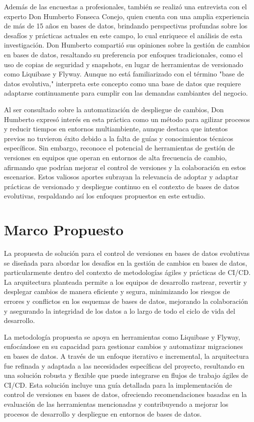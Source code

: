 \documentclass{IEEEtran}
\begin{document}
Además de las encuestas a profesionales, también se realizó una entrevista con el experto Don Humberto Fonseca Conejo, quien cuenta con una amplia experiencia de más de 15 años en bases de datos, brindando perspectivas profundas sobre los desafíos y prácticas actuales en este campo, lo cual enriquece el análisis de esta investigación. Don Humberto compartió sus opiniones sobre la gestión de cambios en bases de datos, resaltando su preferencia por enfoques tradicionales, como el uso de copias de seguridad y snapshots, en lugar de herramientas de versionado como Liquibase y Flyway. Aunque no está familiarizado con el término "base de datos evolutiva," interpreta este concepto como una base de datos que requiere adaptarse continuamente para cumplir con las demandas cambiantes del negocio.

Al ser consultado sobre la automatización de despliegue de cambios, Don Humberto expresó interés en esta práctica como un método para agilizar procesos y reducir tiempos en entornos multiambiente, aunque destaca que intentos previos no tuvieron éxito debido a la falta de guías y conocimientos técnicos específicos. Sin embargo, reconoce el potencial de herramientas de gestión de versiones en equipos que operan en entornos de alta frecuencia de cambio, afirmando que podrían mejorar el control de versiones y la colaboración en estos escenarios. Estos valiosos aportes subrayan la relevancia de adoptar y adaptar prácticas de versionado y despliegue continuo en el contexto de bases de datos evolutivas, respaldando así los enfoques propuestos en este estudio.


\section{Marco Propuesto}
La propuesta de solución para el control de versiones en bases de datos evolutivas se diseñada para abordar los desafíos en la gestión de cambios en bases de datos, particularmente dentro del contexto de metodologías ágiles y prácticas de CI/CD. La arquitectura planteada permite a los equipos de desarrollo rastrear, revertir y desplegar cambios de manera eficiente y segura, minimizando los riesgos de errores y conflictos en los esquemas de bases de datos, mejorando la colaboración y asegurando la integridad de los datos a lo largo de todo el ciclo de vida del desarrollo.

La metodología propuesta se apoya en herramientas como Liquibase y Flyway, enfocándose en su capacidad para gestionar cambios y automatizar migraciones en bases de datos. A través de un enfoque iterativo e incremental, la arquitectura fue refinada y adaptada a las necesidades específicas del proyecto, resultando en una solución robusta y flexible que puede integrarse en flujos de trabajo ágiles de CI/CD. Esta solución incluye una guía detallada para la implementación de control de versiones en bases de datos, ofreciendo recomendaciones basadas en la evaluación de las herramientas mencionadas y contribuyendo a mejorar los procesos de desarrollo y despliegue en entornos de bases de datos.
\end{document}
